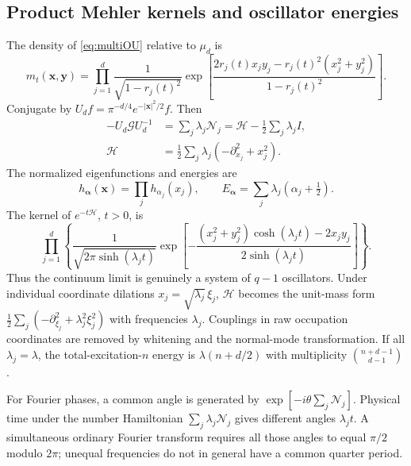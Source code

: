\documentclass[11pt,reqno]{amsart}
\theoremstyle{definition}
\theoremstyle{remark}
\newcommand{\NN}{\mathcal N}
\newcommand{\Id}{I}
\begin{document}
\subsection{Product Mehler kernels and oscillator energies}
The density of \eqref{eq:multiOU} relative to $\mu_d$ is
\begin{equation}\label{eq:multimehler}
m_t(\mathbf x,\mathbf y)=\prod_{j=1}^d
\frac1{\sqrt{1-r_j(t)^2}}
\exp\left[\frac{2r_j(t)x_jy_j-r_j(t)^2(x_j^2+y_j^2)}{1-r_j(t)^2}\right].
\end{equation}
Conjugate by $U_df=\pi^{-d/4}e^{-|\mathbf x|^2/2}f$. Then
\begin{equation}\label{eq:multiHamiltonian}
\begin{aligned}
-U_d\mathcal GU_d^{-1}&=\sum_j\lambda_j\NN_j
=\mathcal H-\frac12\sum_j\lambda_j\Id,\\
\mathcal H&=\frac12\sum_j\lambda_j(-\partial_{x_j}^2+x_j^2).
\end{aligned}
\end{equation}
The normalized eigenfunctions and energies are
\[
h_{\boldsymbol\alpha}(\mathbf x)=\prod_jh_{\alpha_j}(x_j),\qquad
E_{\boldsymbol\alpha}=\sum_j\lambda_j(\alpha_j+\tfrac12).
\]
The kernel of $e^{-t\mathcal H}$, $t>0$, is
\begin{equation}\label{eq:multiheat}
\prod_{j=1}^d\left\{
\frac{1}{\sqrt{2\pi\sinh(\lambda_jt)}}
\exp\left[-\frac{(x_j^2+y_j^2)\cosh(\lambda_jt)-2x_jy_j}
{2\sinh(\lambda_jt)}\right]\right\}.
\end{equation}
Thus the continuum limit is genuinely a system of $q-1$ oscillators.
Under individual coordinate dilations $x_j=\sqrt{\lambda_j}\,\xi_j$,
$\mathcal H$ becomes the unit-mass form
$\frac12\sum_j(-\partial_{\xi_j}^2+\lambda_j^2\xi_j^2)$ with frequencies
$\lambda_j$. Couplings in raw occupation coordinates are removed by
whitening and the normal-mode transformation. If all $\lambda_j=\lambda$,
the total-excitation-$n$ energy is $\lambda(n+d/2)$ with multiplicity
$\binom{n+d-1}{d-1}$.

For Fourier phases, a common angle is generated by
$\exp[-i\theta\sum_j\NN_j]$. Physical time under the number Hamiltonian
$\sum_j\lambda_j\NN_j$ gives different angles $\lambda_jt$.
A simultaneous ordinary Fourier transform requires all those angles
to equal $\pi/2$ modulo $2\pi$; unequal frequencies do not in general
have a common quarter period.
\end{document}
